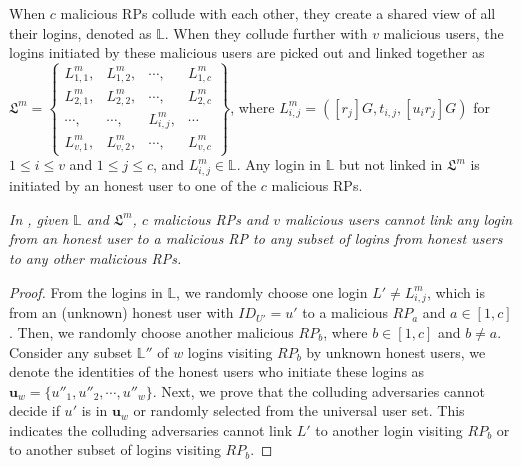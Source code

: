 \begin{theorem}
  When $c$ malicious RPs collude with each other, they create a shared view of all their logins, denoted as $\mathbb{L}$.
  When they collude further with $v$ malicious users, the logins initiated by these malicious users are picked out and linked together as
  $\mathfrak{L}^m=\left \{ \begin{matrix}
  L^m_{1,1},&L^m_{1,2},&\cdots,&L^m_{1,c}\\
  L^m_{2,1},& L^m_{2,2},&\cdots,&L^m_{2,c}\\
  \cdots,&\cdots,&L^m_{i,j},&\cdots\\
  L^m_{v,1},&L^m_{v,2},&\cdots,&L^m_{v,c}
  \end{matrix}\right\}$,
  where $L^m_{i, j}=([r_j]G, t_{i,j}, [u_ir_j]G)$ for $1 \le i \le v$ and $1 \le j \le c$, and $L^m_{i,j} \in \mathbb{L}$. Any login in $\mathbb{L}$ but not linked in $\mathfrak{L}^m$ is initiated by an honest user to one of the $c$ malicious RPs.


  \begin{theorem}\label{rp-privacy-proof}
  \emph{In \usso, given $\mathbb{L}$ and $\mathfrak{L}^m$, $c$ malicious RPs and $v$ malicious users cannot link any login from an honest user to a malicious RP to any subset of logins from honest users to any other malicious RPs.}
  \end{theorem}


  \begin{proof} 
  From the logins in $\mathbb{L}$,
  we randomly choose one login $L' \neq L^m_{i,j}$,
  which is from an (unknown) honest user with $ID_{U'}=u'$ to a malicious $RP_a$ and $a \in [1,c]$.
  Then, we randomly choose another malicious $RP_b$, where $b \in [1,c]$ and $b \neq a$.
  Consider any subset $\mathbb{L}''$ of $w$ logins visiting $RP_b$ by unknown honest users,
  we denote the identities of the honest users who initiate these logins as $\mathbf{u}_w=\{{u''_1}, {u''_2}, \cdots, {u''_w}\}$.
  Next, we prove that the colluding adversaries cannot decide if $u'$ is in $\mathbf{u}_w$ or randomly selected from the universal user set.
  This indicates the colluding adversaries cannot link $L'$ to another login visiting $RP_b$
  or to another subset of logins visiting $RP_b$.


\end{proof}
\end{theorem}
